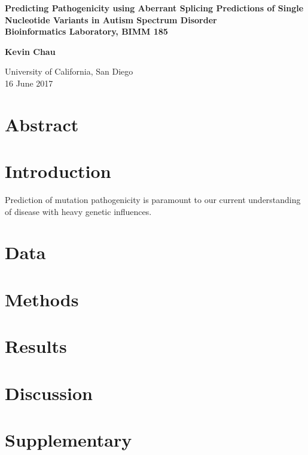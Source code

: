 \documentclass[12pt]{article}
\begin{document}
\begin{titlepage}
    \begin{center}
        \vspace*{1cm}

        \Huge
        \textbf{Predicting Pathogenicity using Aberrant Splicing Predictions of Single Nucleotide Variants in Autism Spectrum Disorder}\\


        \vspace{0.5cm}
        \Large
        \textbf{Bioinformatics Laboratory, BIMM 185}

        \vspace{1.5cm}
        \textbf{Kevin Chau}

        \vfill

        \Large
        University of California, San Diego\\
        16 June 2017
    \end{center}
\end{titlepage}

\section{Abstract}

\section{Introduction}
Prediction of mutation pathogenicity is paramount to our current understanding
of disease with heavy genetic influences. 

\section{Data}

\section{Methods}

\section{Results}

\section{Discussion}

\section{Supplementary}
\end{document}
